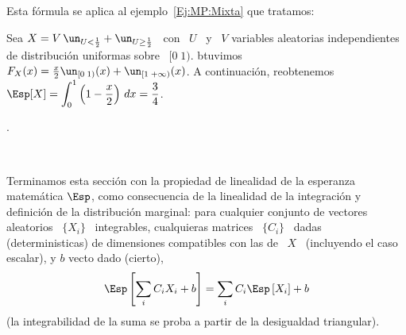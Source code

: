 Esta f\'ormula se aplica al ejemplo~\ref{Ej:MP:Mixta} que tratamos:
%
\begin{ejemplo}
\label{Ej:MP:EspMixtaPositiva}
%
Sea $X =  V \, \un_{U <  \frac12} + \un_{U \ge \frac12}$  \ con \ $U$ \  y \ $V$
variables aleatorias  independientes de distribuci\'on uniformas sobre  \ $[0 \;
1)$.  btuvimos
\  $F_X(x)  = \frac{x}{2}  \un_{[0  \; 1)}(x)  +  \un_{[1  \; +\infty)}(x)$.   A
continuaci\'on,  reobtenemos \  $\displaystyle  \Esp[X] =  \int_0^1  \left( 1  -
  \frac{x}{2} \right) \, dx = \frac34$.
\end{ejemplo}.

\

Terminamos  esta  secci\'on con  la  propiedad  de  linealidad de  la  esperanza
matem\'atica $\Esp$,  como consecuencia de  la linealidad de la  integraci\'on y
definici\'on de la distribuci\'on  marginal: para cualquier conjunto de vectores
aleatorios \  $\{ X_i \}$  \ integrables, cualquieras  matrices \ $\{ C_i  \}$ \
dadas  (deterministicas)  de  dimensiones  compatibles   con  las  de  \  $X$  \
(incluyendo el caso escalar), y $b$ vecto dado (cierto),
%
\[
\Esp\left[ \sum_i C_i X_i + b \right] = \sum_i C_i \Esp\left[ X_i \right] + b
\]
%
(la integrabilidad de la suma se proba a partir de la desigualdad triangular).




\label{Ssec:MP:Momentos}


